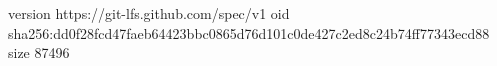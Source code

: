 version https://git-lfs.github.com/spec/v1
oid sha256:dd0f28fcd47faeb64423bbc0865d76d101c0de427c2ed8c24b74ff77343ecd88
size 87496
